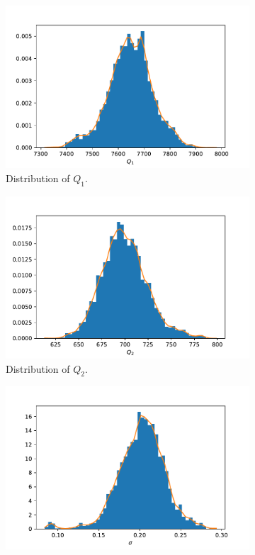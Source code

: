 \begin{figure}[h!]
\begin{subfigure}{.5\textwidth}
  \includegraphics[width=\linewidth]{figures/bayesian/EXP_Q/hist_Q1.pdf}
  \caption{Distribution of $Q_{1}$.}
  \label{fig:subhistTm1}
\end{subfigure}%
\begin{subfigure}{.5\textwidth}
  \centering
  \includegraphics[width=\linewidth]{figures/bayesian/EXP_Q/hist_Q2.pdf}
  \caption{Distribution of $Q_{2}$.}
  \label{fig:subhistTm2}
\end{subfigure}
\newline
\begin{subfigure}{.5\textwidth}
  \centering
  \includegraphics[width=\linewidth]{figures/bayesian/EXP_Q/hist_sigma.pdf}

\end{subfigure}
\end{figure}
